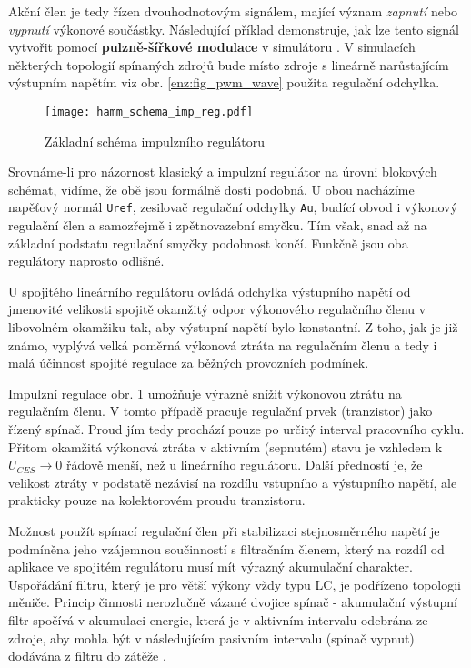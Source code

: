 {    Akční člen je tedy řízen dvouhodnotovým signálem, mající význam \emph{zapnutí} nebo 
    \emph{vypnutí} výkonové součástky. Následující příklad demonstruje, jak lze tento signál 
    vytvořit pomocí \textbf{pulzně-šířkové modulace} v simulátoru \ltLtspiceSW. V simulacích 
    některých topologií spínaných zdrojů bude místo zdroje s lineárně narůstajícím výstupním 
    napětím viz obr. \ref{enz:fig_pwm_wave} použita regulační odchylka.
    
    \begin{figure}[ht!]
      \centering
      \texttt{[image: hamm\_schema\_imp\_reg.pdf]}
      \caption[Schéma impulzního regulátoru]{Základní schéma impulzního regulátoru}
      \label{enz:fig_imp_reg_basic}
    \end{figure}
    
    Srovnáme-li pro názornost klasický a impulzní regulátor na úrovni blokových schémat, vidíme, že 
    obě jsou formálně dosti podobná. U obou nacházíme napěťový normál \texttt{Uref}, zesilovač 
    regulační odchylky \texttt{Au}, budící obvod i výkonový regulační člen a samozřejmě i 
    zpětnovazební smyčku. Tím však, snad až na základní podstatu regulační smyčky podobnost končí. 
    Funkčně jsou oba regulátory naprosto odlišné.
    
    U spojitého lineárního regulátoru ovládá odchylka výstupního napětí od jmenovité velikosti 
    spojitě okamžitý odpor výkonového regulačního členu v libovolném o\-kam\-ži\-ku tak, aby 
    výstupní napětí bylo konstantní. Z toho, jak je již známo, vyplývá velká poměrná výkonová 
    ztráta na regulačním členu a tedy i malá účinnost spojité regulace za běžných provozních 
    podmínek.
    
    Impulzní regulace obr. \ref{enz:fig_imp_reg_basic} umožňuje výrazně snížit výkonovou ztrátu na
    regulačním členu. V tomto případě pracuje regulační prvek (tranzistor) jako řízený spínač. 
    Proud jím tedy prochází pouze po určitý interval pracovního cyklu. Přitom okamžitá výkonová 
    ztráta v aktivním (sepnutém) stavu je vzhledem k $U_{CES}\rightarrow 0$ řádově menší, než u 
    lineárního regulátoru. Další předností je, že velikost ztráty v podstatě nezávisí na rozdílu 
    vstupního a výstupního napětí, ale prakticky pouze na kolektorovém proudu tranzistoru.
    
    Možnost použít spínací regulační člen při stabilizaci stejnosměrného napětí je podmíněna jeho 
    vzájemnou součinností s filtračním členem, který na rozdíl od aplikace ve spojitém regulátoru 
    musí mít výrazný akumulační charakter. Uspořádání filtru, který je pro větší výkony vždy typu 
    LC, je podřízeno topologii měniče. Princip činnosti nerozlučně vázané dvojice spínač - 
    akumulační výstupní filtr spočívá v akumulaci energie, která je v aktivním intervalu odebrána 
    ze zdroje, aby mohla být v následujícím pasivním intervalu (spínač vypnut) dodávána z filtru do 
    zátěže \cite[s.~121]{Hammembauer}.
           
}
